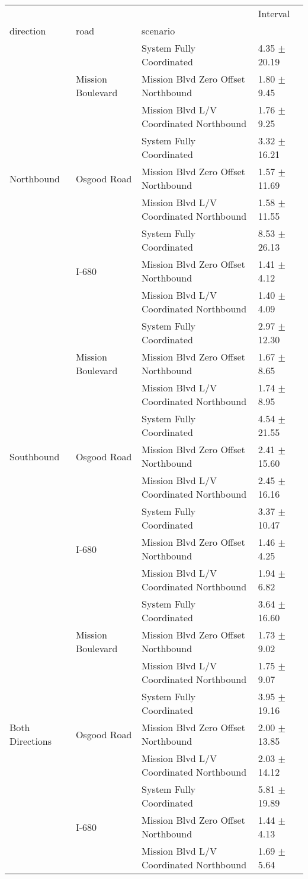 \begin{tabular}{llll}
\toprule
 &  &  & Interval \\
direction & road & scenario &  \\
\midrule
\multirow[t]{9}{*}{Northbound} & \multirow[t]{3}{*}{Mission Boulevard} & System Fully Coordinated & 4.35 $\pm$ 20.19 \\
 &  & Mission Blvd Zero Offset Northbound & 1.80 $\pm$ 9.45 \\
 &  & Mission Blvd L/V Coordinated Northbound & 1.76 $\pm$ 9.25 \\
 & \multirow[t]{3}{*}{Osgood Road} & System Fully Coordinated & 3.32 $\pm$ 16.21 \\
 &  & Mission Blvd Zero Offset Northbound & 1.57 $\pm$ 11.69 \\
 &  & Mission Blvd L/V Coordinated Northbound & 1.58 $\pm$ 11.55 \\
 & \multirow[t]{3}{*}{I-680} & System Fully Coordinated & 8.53 $\pm$ 26.13 \\
 &  & Mission Blvd Zero Offset Northbound & 1.41 $\pm$ 4.12 \\
 &  & Mission Blvd L/V Coordinated Northbound & 1.40 $\pm$ 4.09 \\
\multirow[t]{9}{*}{Southbound} & \multirow[t]{3}{*}{Mission Boulevard} & System Fully Coordinated & 2.97 $\pm$ 12.30 \\
 &  & Mission Blvd Zero Offset Northbound & 1.67 $\pm$ 8.65 \\
 &  & Mission Blvd L/V Coordinated Northbound & 1.74 $\pm$ 8.95 \\
 & \multirow[t]{3}{*}{Osgood Road} & System Fully Coordinated & 4.54 $\pm$ 21.55 \\
 &  & Mission Blvd Zero Offset Northbound & 2.41 $\pm$ 15.60 \\
 &  & Mission Blvd L/V Coordinated Northbound & 2.45 $\pm$ 16.16 \\
 & \multirow[t]{3}{*}{I-680} & System Fully Coordinated & 3.37 $\pm$ 10.47 \\
 &  & Mission Blvd Zero Offset Northbound & 1.46 $\pm$ 4.25 \\
 &  & Mission Blvd L/V Coordinated Northbound & 1.94 $\pm$ 6.82 \\
\multirow[t]{9}{*}{Both Directions} & \multirow[t]{3}{*}{Mission Boulevard} & System Fully Coordinated & 3.64 $\pm$ 16.60 \\
 &  & Mission Blvd Zero Offset Northbound & 1.73 $\pm$ 9.02 \\
 &  & Mission Blvd L/V Coordinated Northbound & 1.75 $\pm$ 9.07 \\
 & \multirow[t]{3}{*}{Osgood Road} & System Fully Coordinated & 3.95 $\pm$ 19.16 \\
 &  & Mission Blvd Zero Offset Northbound & 2.00 $\pm$ 13.85 \\
 &  & Mission Blvd L/V Coordinated Northbound & 2.03 $\pm$ 14.12 \\
 & \multirow[t]{3}{*}{I-680} & System Fully Coordinated & 5.81 $\pm$ 19.89 \\
 &  & Mission Blvd Zero Offset Northbound & 1.44 $\pm$ 4.13 \\
 &  & Mission Blvd L/V Coordinated Northbound & 1.69 $\pm$ 5.64 \\
\bottomrule
\end{tabular}
